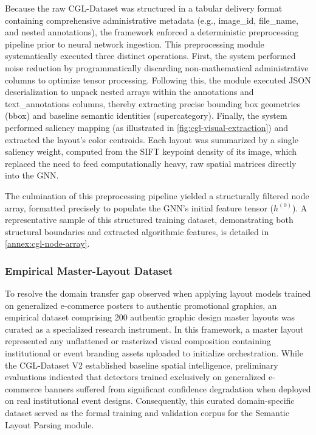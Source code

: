 \begin{refsection}
Because the raw CGL-Dataset was structured in a tabular delivery format containing comprehensive administrative metadata (e.g., image\_id, file\_name, and nested annotations), the framework enforced a deterministic preprocessing pipeline prior to neural network ingestion. This preprocessing module systematically executed three distinct operations. First, the system performed noise reduction by programmatically discarding non-mathematical administrative columns to optimize tensor processing. Following this, the module executed JSON deserialization to unpack nested arrays within the annotations and text\_annotations columns, thereby extracting precise bounding box geometries (bbox) and baseline semantic identities (supercategory). Finally, the system performed saliency mapping (as illustrated in \ref{fig:cgl-visual-extraction}) and extracted the layout's color centroids. Each layout was summarized by a single saliency weight, computed from the SIFT keypoint density of its image, which replaced the need to feed computationally heavy, raw spatial matrices directly into the GNN.

The culmination of this preprocessing pipeline yielded a structurally filtered node array, formatted precisely to populate the GNN's initial feature tensor ($h^{(0)}$). A representative sample of this structured training dataset, demonstrating both structural boundaries and extracted algorithmic features, is detailed in \ref{annex:cgl-node-array}.

\subsubsection{Empirical Master-Layout Dataset}
To resolve the domain transfer gap observed when applying layout models trained on generalized e-commerce posters to authentic promotional graphics, an empirical dataset comprising 200 authentic graphic design master layouts was curated as a specialized research instrument. In this framework, a master layout represented any unflattened or rasterized visual composition containing institutional or event branding assets uploaded to initialize orchestration. While the CGL-Dataset V2 established baseline spatial intelligence, preliminary evaluations indicated that detectors trained exclusively on generalized e-commerce banners suffered from significant confidence degradation when deployed on real institutional event designs. Consequently, this curated domain-specific dataset served as the formal training and validation corpus for the Semantic Layout Parsing module.


\end{refsection}
